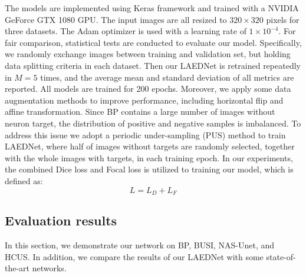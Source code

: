 \documentclass[review]{elsarticle}
\begin{document}
The models are implemented using Keras framework and trained with a NVIDIA GeForce GTX 1080 GPU. The input images are all resized to $320\times320$ pixels for three datasets. The Adam optimizer\cite{2015Adam} is used with a learning rate of $1\times 10^{-4}$. For fair comparison, statistical tests are conducted to evaluate our model. Specifically, we randomly exchange images between training and validation set, but holding data splitting criteria in each dataset. Then our LAEDNet is retrained repeatedly in $M = 5$ times, and the average mean and standard deviation of all metrics are reported. All models are trained for 200 epochs. Moreover, we apply some data augmentation methods to improve performance, including horizontal flip and affine transformation. Since BP\cite{Kaggle} contains a large number of images without neuron target, the distribution of positive and negative samples is imbalanced. To address this issue we adopt a periodic under-sampling (PUS) method to train LAEDNet, where half of images without targets are randomly selected, together with the whole images with targets, in each training epoch. In our experiments, the combined Dice loss \cite{2016V} and Focal loss \cite{2017Focal} is utilized to training our model, which is defined as:
\begin{equation}
	L=L_{D}+L_{F}
\end{equation}
    
\subsection{Evaluation results}

In this section, we demonstrate our network on BP\cite{Kaggle}, BUSI\cite{2019Dataset}, NAS-Unet\cite{2019Nas-unet}, and HCUS\cite{2018Automated}. In addition, we compare the results of our LAEDNet with some state-of-the-art networks.
\end{document}
